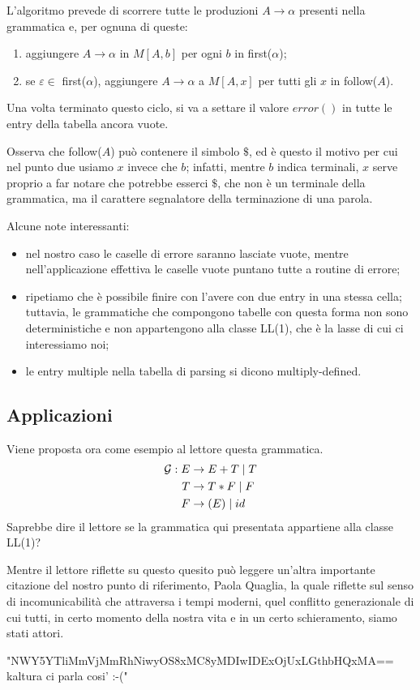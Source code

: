 \documentclass[class=book, crop=false, oneside, 12pt]{standalone}
\begin{document}
L'algoritmo prevede di scorrere tutte le produzioni \(A \to \alpha\) presenti nella grammatica e, per ognuna di queste:
\begin{enumerate}
    \item aggiungere \(A \to \alpha\) in \(M[A, b]\) per ogni \(b\) in first(\(\alpha\));
    \item se  \(\varepsilon \in\) first(\(\alpha\)), aggiungere \(A \to \alpha\) a \(M[A, x]\) per tutti gli \(x\) in follow(\(A\)). 
\end{enumerate}
Una volta terminato questo ciclo, si va a settare il valore \(error()\) in tutte le entry della tabella ancora vuote.

Osserva che follow(\(A\)) può contenere il simbolo \(\$\), ed è questo il motivo per cui nel punto due usiamo \(x\) invece che \(b\); infatti, mentre \(b\) indica terminali, \(x\) serve proprio a far notare che potrebbe esserci \(\$\), che non è un terminale della grammatica, ma il carattere segnalatore della terminazione di una parola.

Alcune note interessanti:
\begin{itemize}
    \item nel nostro caso le caselle di errore saranno lasciate vuote, mentre nell’applicazione effettiva le caselle vuote puntano tutte a routine di errore;
    \item ripetiamo che è possibile finire con l'avere con due entry in una stessa cella; tuttavia, le grammatiche che compongono tabelle con questa forma non sono deterministiche e non appartengono alla classe LL(1), che è la lasse di cui ci interessiamo noi;
    \item le entry multiple nella tabella di parsing si dicono multiply-defined.
\end{itemize}

\subsection{Applicazioni}
Viene proposta ora come esempio al lettore questa grammatica.
\begin{align}
    \label{non-ll1_grammar}
    \mathcal{G}: E &\to E+T \mid T \\
    T &\to T*F \mid F \nonumber \\ \notag
    F &\to (E) \mid id \nonumber  \notag
\end{align}
Saprebbe dire il lettore se la grammatica qui presentata appartiene alla classe LL(1)?

Mentre il lettore riflette su questo quesito può leggere un'altra importante citazione del nostro punto di riferimento, Paola Quaglia, la quale riflette sul senso di incomunicabilità che attraversa i tempi moderni, quel conflitto generazionale di cui tutti, in certo momento della nostra vita e in un certo schieramento, siamo stati attori.
\begin{displayquote}
    "NWY5YTliMmVjMmRhNiwyOS8xMC8yMDIwIDExOjUxLGthbHQxMA==  kaltura ci parla cosi' :-("
\end{displayquote}
\end{document}
